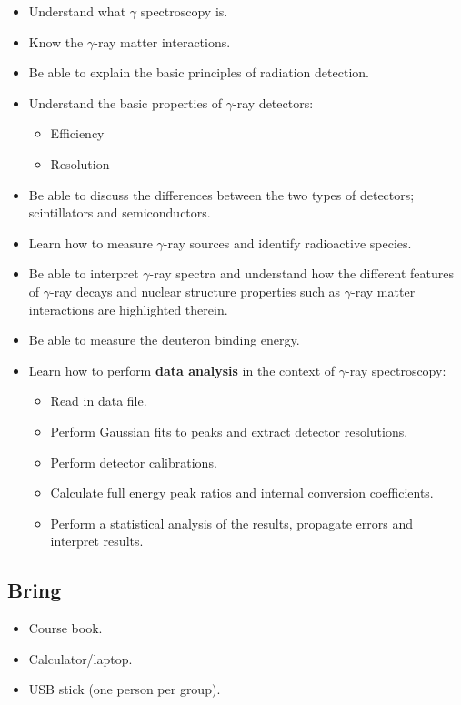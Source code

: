 \documentclass[12pt]{article}
\begin{document}
\begin{itemize}
  \item Understand what $\gamma$ spectroscopy is.
  \item Know the $\gamma$-ray matter interactions.
  \item Be able to explain the basic principles of radiation detection.
  \item Understand the basic properties of $\gamma$-ray detectors:
  \begin{itemize}
    \item Efficiency
    \item Resolution
  \end{itemize}
  \item Be able to discuss the differences between the two types of detectors; scintillators and semiconductors.
  \item Learn how to measure $\gamma$-ray sources and identify radioactive species.
  \item Be able to interpret $\gamma$-ray spectra and understand how the different features of $\gamma$-ray decays and nuclear structure properties such as $\gamma$-ray matter interactions are highlighted therein.
  \item Be able to measure the deuteron binding energy.
  \item Learn how to perform \textbf{data analysis} in the context of $\gamma$-ray spectroscopy:
  \begin{itemize}
    \item Read in data file.
    \item Perform Gaussian fits to peaks and extract detector resolutions.
    \item Perform detector calibrations.
    \item Calculate full energy peak ratios and internal conversion coefficients.
    \item Perform a statistical analysis of the results, propagate errors and interpret results.
  \end{itemize}
\end{itemize}


\subsection*{Bring}
\begin{itemize}
  \item Course book.
  \item Calculator/laptop.
  \item USB stick (one person per group).
\end{itemize}
\end{document}
